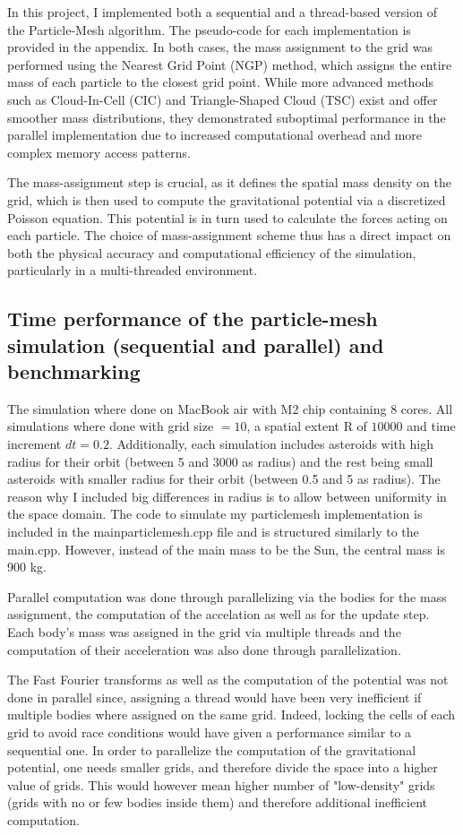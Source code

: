 \documentclass{article}
\begin{document}
In this project, I implemented both a sequential and a thread-based version of the Particle-Mesh algorithm. The pseudo-code for each implementation is provided in the appendix. In both cases, the mass assignment to the grid was performed using the Nearest Grid Point (NGP) method, which assigns the entire mass of each particle to the closest grid point. While more advanced methods such as Cloud-In-Cell (CIC) and Triangle-Shaped Cloud (TSC) exist and offer smoother mass distributions, they demonstrated suboptimal performance in the parallel implementation due to increased computational overhead and more complex memory access patterns.

The mass-assignment step is crucial, as it defines the spatial mass density on the grid, which is then used to compute the gravitational potential via a discretized Poisson equation. This potential is in turn used to calculate the forces acting on each particle. The choice of mass-assignment scheme thus has a direct impact on both the physical accuracy and computational efficiency of the simulation, particularly in a multi-threaded environment.

\subsection{Time performance of the particle-mesh simulation (sequential and parallel) and benchmarking}
The simulation where done on MacBook air with M2 chip containing 8 cores.
All simulations where done with grid size $= 10$, a spatial extent R of $10 000$ and time increment $dt = 0.2$. Additionally, each simulation includes asteroids with high radius for their orbit (between 5 and 3000  as radius)  and the rest being small asteroids with smaller radius for their orbit (between 0.5 and 5 as radius). 
The reason why I included big differences in radius is to allow between uniformity in the space domain. 
The code to simulate my particlemesh implementation is included in the mainparticlemesh.cpp file and is structured similarly to the main.cpp.
However, instead of the main mass to be the Sun, the central mass is 900 kg. 

Parallel computation was done through parallelizing via the bodies for the mass assignment, the computation of the accelation as well as for the update step. Each body's mass was assigned in the grid via multiple threads and the computation of their acceleration was also done through parallelization. 

The Fast Fourier transforms as well as the computation of the potential was not done in parallel since, assigning a thread would have been very inefficient if multiple bodies where assigned on the same grid. Indeed, locking the cells of each grid to avoid race conditions would have given a performance similar to a sequential one. In order to parallelize the computation of the gravitational potential, one needs smaller grids, and therefore divide the space into a higher value of grids. This would however mean higher number of "low-density" grids (grids with no or few bodies inside them) and therefore additional inefficient computation. 
\end{document}
